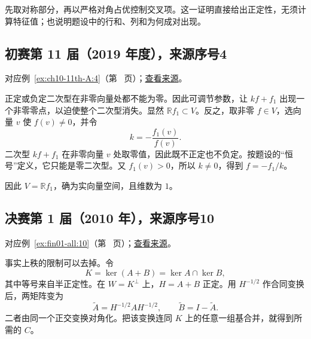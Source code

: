 \documentclass[UTF8,12pt,a4paper,fontset=fandol]{ctexart}
\begin{document}
\begin{remark}[方法与条件]

先取对称部分，再以严格对角占优控制交叉项。这一证明直接给出正定性，无须计算特征值；也说明题设中的行和、列和为何成对出现。

\end{remark}

\subsection{初赛第 11 届（2019 年度），来源序号4}\label{ans:ch10-11th-A:4}\label{pr:ch10-11th-A:4}

对应例~\ref{ex:ch10-11th-A:4}（第~\pageref{ex:ch10-11th-A:4} 页）；\href{https://github.com/lzxcr/cmc-mathematics/blob/64916fa1fdbc3e444a652eca204d5669058ee321/src/problems/preliminary/11/04.md}{查看来源}。

\begin{solve}

正定或负定二次型在非零向量处都不能为零。因此可调节参数，让 $kf+f_1$ 出现一个非零零点，以迫使整个二次型消失。显然 $\mathbb R f_1\subset V$。反之，取非零 $f\in V$，选向量 $v$ 使 $f(v)\neq0$，并令
\[
k=-\frac{f_1(v)}{f(v)}.
\]
二次型 $kf+f_1$ 在非零向量 $v$ 处取零值，因此既不正定也不负定。按题设的“恒号”定义，它只能是零二次型。又 $f_1(v)>0$，所以 $k\neq0$，得到 $f=-f_1/k$。

因此 $V=\mathbb R f_1$，确为实向量空间，且维数为 $1$。

\end{solve}

\subsection{决赛第 1 届（2010 年），来源序号10}\label{ans:fin01-all:10}\label{pr:fin01-all:10}

对应例~\ref{ex:fin01-all:10}（第~\pageref{ex:fin01-all:10} 页）；\href{https://github.com/lzxcr/cmc-mathematics/blob/64916fa1fdbc3e444a652eca204d5669058ee321/src/problems/finals/01/10.md}{查看来源}。

\begin{solve}

事实上秩的限制可以去掉。令
\[
K=\ker(A+B)=\ker A\cap\ker B,
\]
其中等号来自半正定性。在 $W=K^\perp$ 上，$H=A+B$ 正定。用 $H^{-1/2}$ 作合同变换后，两矩阵变为
\[
\widetilde A=H^{-1/2}AH^{-1/2},\qquad
\widetilde B=I-\widetilde A.
\]
二者由同一个正交变换对角化。把该变换连同 $K$ 上的任意一组基合并，就得到所需的 $C$。

\end{solve}
\end{document}
